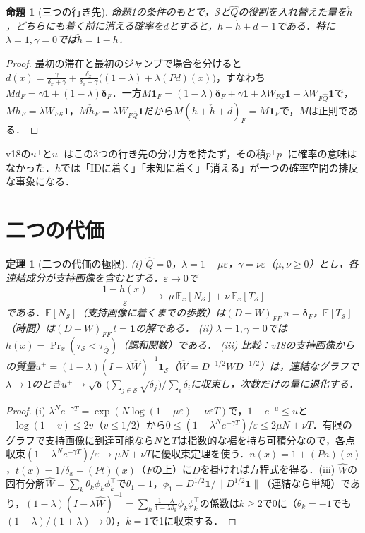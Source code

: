 \documentclass[a4paper,10pt,dvipdfmx]{jsarticle}
\newtheorem{theorem}{定理}
\newtheorem{proposition}{命題}
\theoremstyle{definition}
\newcommand{\cS}{\mathcal{S}}
\newcommand{\hQ}{\hat{Q}}
\newcommand{\E}{\mathbb{E}}
\newcommand{\pP}{p^{+}}
\newcommand{\pN}{p^{-}}
\begin{document}
\begin{proposition}[三つの行き先]
命題1の条件のもとで，$\cS$と$\hQ$の役割を入れ替えた量を$\check h$，どちらにも着く前に消える確率を$d$とすると，$h+\check h+d=1$である．特に$\lambda{=}1,\gamma{=}0$では$\check h=1-h$．
\end{proposition}
\begin{proof}
最初の滞在と最初のジャンプで場合を分けると$d(x)=\frac{\gamma}{\delta_x+\gamma}+\frac{\delta_x}{\delta_x+\gamma}\big((1-\lambda)+\lambda(Pd)(x)\big)$，すなわち$Md_F=\gamma\mathbf{1}+(1-\lambda)\bm{\delta}_F$．一方$M\mathbf{1}_F=(1-\lambda)\bm{\delta}_F+\gamma\mathbf{1}+\lambda W_{F\cS}\mathbf{1}+\lambda W_{F\hQ}\mathbf{1}$で，$Mh_F=\lambda W_{F\cS}\mathbf{1}$，$M\check h_F=\lambda W_{F\hQ}\mathbf{1}$だから$M(h+\check h+d)_F=M\mathbf{1}_F$で，$M$は正則である．
\end{proof}

v18の$u^{+}$と$u^{-}$はこの3つの行き先の分け方を持たず，その積$\pP\pN$に確率の意味はなかった．$h$では「IDに着く」「未知に着く」「消える」が一つの確率空間の排反な事象になる．

\section{二つの代価}
\label{sec:prices}
\begin{theorem}[二つの代価の極限]
(i) $\hQ=\emptyset$，$\lambda=1-\mu\varepsilon$，$\gamma=\nu\varepsilon$（$\mu,\nu\ge0$）とし，各連結成分が支持画像を含むとする．$\varepsilon\to0$で
\begin{equation}
\frac{1-h(x)}{\varepsilon}\ \to\ \mu\,\E_x[N_{\cS}]+\nu\,\E_x[T_{\cS}]
\label{eq:cost}
\end{equation}
である．$\E[N_{\cS}]$（支持画像に着くまでの歩数）は$(D-W)_{FF}\,n=\bm{\delta}_F$，$\E[T_{\cS}]$（時間）は$(D-W)_{FF}\,t=\mathbf{1}$の解である．
(ii) $\lambda{=}1,\gamma{=}0$では$h(x)=\Pr_x(\tau_{\cS}<\tau_{\hQ})$（調和関数）である．
(iii) 比較：v18の支持画像からの質量$u^{+}=(1-\lambda)(I-\lambda\hat W)^{-1}\mathbf{1}_{\cS}$（$\hat W=D^{-1/2}WD^{-1/2}$）は，連結なグラフで$\lambda\to1$のとき$u^{+}\to\sqrt{\bm{\delta}}\,\big(\sum_{j\in\cS}\sqrt{\delta_j}\big)/\sum_i\delta_i$に収束し，次数だけの量に退化する．
\end{theorem}
\begin{proof}
(i) $\lambda^{N}e^{-\gamma T}=\exp(N\log(1-\mu\varepsilon)-\nu\varepsilon T)$で，$1-e^{-u}\le u$と$-\log(1-v)\le2v$（$v\le1/2$）から$0\le(1-\lambda^Ne^{-\gamma T})/\varepsilon\le2\mu N+\nu T$．有限のグラフで支持画像に到達可能なら$N$と$T$は指数的な裾を持ち可積分なので，各点収束$(1-\lambda^Ne^{-\gamma T})/\varepsilon\to\mu N+\nu T$に優収束定理を使う．$n(x)=1+(Pn)(x)$，$t(x)=1/\delta_x+(Pt)(x)$（$F$の上）に$D$を掛ければ方程式を得る．(iii) $\hat W$の固有分解$\hat W=\sum_k\theta_k\phi_k\phi_k^{\top}$で$\theta_1=1$，$\phi_1=D^{1/2}\mathbf{1}/\|D^{1/2}\mathbf{1}\|$（連結なら単純）であり，$(1-\lambda)(I-\lambda\hat W)^{-1}=\sum_k\frac{1-\lambda}{1-\lambda\theta_k}\phi_k\phi_k^{\top}$の係数は$k\ge2$で0に（$\theta_k=-1$でも$(1-\lambda)/(1+\lambda)\to0$），$k=1$で1に収束する．
\end{proof}
\end{document}
